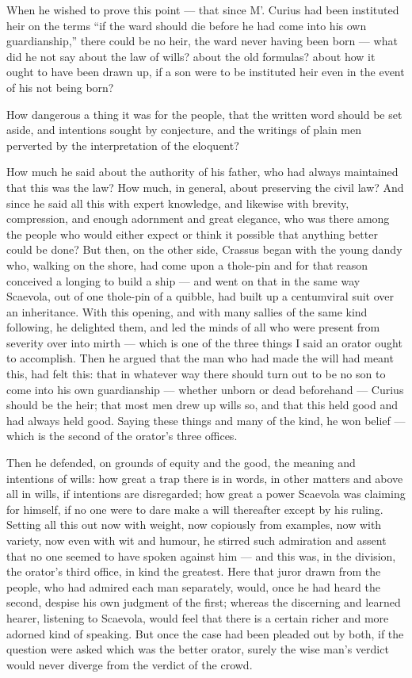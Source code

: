  When he wished to prove this point — that since M'. Curius had been instituted heir on the terms ``if the ward should die before he had come into his own guardianship,'' there could be no heir, the ward never having been born — what did he not say about the law of wills? about the old formulas? about how it ought to have been drawn up, if a son were to be instituted heir even in the event of his not being born?

 How dangerous a thing it was for the people, that the written word should be set aside, and intentions sought by conjecture, and the writings of plain men perverted by the interpretation of the eloquent?

 How much he said about the authority of his father, who had always maintained that this was the law? How much, in general, about preserving the civil law? And since he said all this with expert knowledge, and likewise with brevity, compression, and enough adornment and great elegance, who was there among the people who would either expect or think it possible that anything better could be done? But then, on the other side, Crassus began with the young dandy who, walking on the shore, had come upon a thole-pin and for that reason conceived a longing to build a ship — and went on that in the same way Scaevola, out of one thole-pin of a quibble, had built up a centumviral suit over an inheritance. With this opening, and with many sallies of the same kind following, he delighted them, and led the minds of all who were present from severity over into mirth — which is one of the three things I said an orator ought to accomplish. Then he argued that the man who had made the will had meant this, had felt this: that in whatever way there should turn out to be no son to come into his own guardianship — whether unborn or dead beforehand — Curius should be the heir; that most men drew up wills so, and that this held good and had always held good. Saying these things and many of the kind, he won belief — which is the second of the orator's three offices.

 Then he defended, on grounds of equity and the good, the meaning and intentions of wills: how great a trap there is in words, in other matters and above all in wills, if intentions are disregarded; how great a power Scaevola was claiming for himself, if no one were to dare make a will thereafter except by his ruling. Setting all this out now with weight, now copiously from examples, now with variety, now even with wit and humour, he stirred such admiration and assent that no one seemed to have spoken against him — and this was, in the division, the orator's third office, in kind the greatest. Here that juror drawn from the people, who had admired each man separately, would, once he had heard the second, despise his own judgment of the first; whereas the discerning and learned hearer, listening to Scaevola, would feel that there is a certain richer and more adorned kind of speaking. But once the case had been pleaded out by both, if the question were asked which was the better orator, surely the wise man's verdict would never diverge from the verdict of the crowd.

